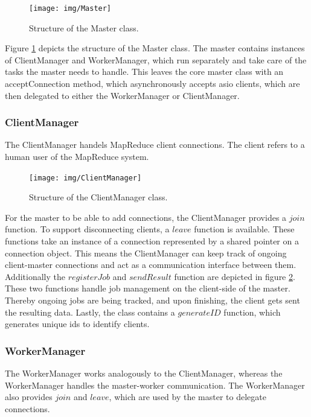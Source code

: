 \documentclass[12pt, letterpaper]{article}
\begin{document}
\begin{figure}[h]
	\centering
	\texttt{[image: img/Master]}
	\caption{Structure of the Master class.}
	\label{fig:classes_Master}
\end{figure}

Figure \ref{fig:classes_Master} depicts the structure of the Master class. The master contains instances of ClientManager and WorkerManager, which run separately and take care of the tasks the master needs to handle. This leaves the core master class with an acceptConnection method, which asynchronously accepts asio clients, which are then delegated to either the WorkerManager or ClientManager.    


\subsubsection{ClientManager}

The ClientManager handels MapReduce client connections. The client refers to a human user of the MapReduce system. 

\begin{figure}[h]
	\centering
	\texttt{[image: img/ClientManager]}
	\caption{Structure of the ClientManager class.}
	\label{fig:classes_ClientManager}
\end{figure}

For the master to be able to add connections, the ClientManager provides a $join$ function. To support disconnecting clients, a $leave$ function is available. These functions take an instance of a connection represented by a shared pointer on a connection object. This means the ClientManager can keep track of ongoing client-master connections and act as a communication interface between them.\newline 
Additionally the $registerJob$ and $sendResult$ function are depicted in figure \ref{fig:classes_ClientManager}. These two functions handle job management on the client-side of the master. Thereby ongoing jobs are being tracked, and upon finishing, the client gets sent the resulting data. Lastly, the class contains a $generateID$ function, which generates unique ids to identify clients.

\subsubsection{WorkerManager}

The WorkerManager works analogously to the ClientManager, whereas the WorkerManager handles the master-worker communication. The WorkerManager also provides $join$ and $leave$, which are used by the master to delegate connections.  
\end{document}
